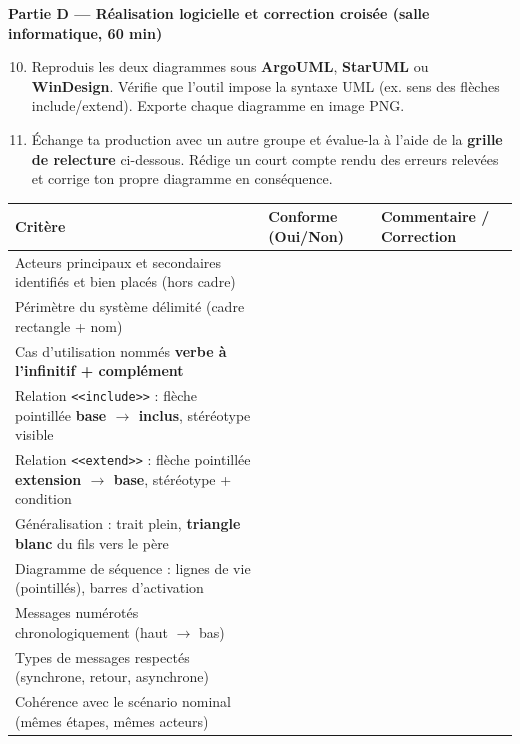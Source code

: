 \documentclass[11pt]{article}
\begin{document}
\textbf{Partie D — Réalisation logicielle et correction croisée (salle informatique, 60 min)}

\begin{enumerate}
  \setcounter{enumi}{9}
  \item Reproduis les deux diagrammes sous \textbf{ArgoUML}, \textbf{StarUML} ou \textbf{WinDesign}. Vérifie que l'outil impose la syntaxe UML (ex. sens des flèches include/extend). Exporte chaque diagramme en image PNG.
  \item Échange ta production avec un autre groupe et évalue-la à l'aide de la \textbf{grille de relecture} ci-dessous. Rédige un court compte rendu des erreurs relevées et corrige ton propre diagramme en conséquence.
\end{enumerate}

\begin{aretenir}
\begin{center}
\begin{tabularx}{\linewidth}{|l|X|X|}\hline
\textbf{Critère} & \textbf{Conforme (Oui/Non)} & \textbf{Commentaire / Correction} \\\hline
Acteurs principaux et secondaires identifiés et bien placés (hors cadre) & & \\\hline
Périmètre du système délimité (cadre rectangle + nom) & & \\\hline
Cas d'utilisation nommés \textbf{verbe à l'infinitif + complément} & & \\\hline
Relation \texttt{<<include>>} : flèche pointillée \textbf{base $\to$ inclus}, stéréotype visible & & \\\hline
Relation \texttt{<<extend>>} : flèche pointillée \textbf{extension $\to$ base}, stéréotype + condition & & \\\hline
Généralisation : trait plein, \textbf{triangle blanc} du fils vers le père & & \\\hline
Diagramme de séquence : lignes de vie (pointillés), barres d'activation & & \\\hline
Messages numérotés chronologiquement (haut $\to$ bas) & & \\\hline
Types de messages respectés (synchrone, retour, asynchrone) & & \\\hline
Cohérence avec le scénario nominal (mêmes étapes, mêmes acteurs) & & \\\hline
\end{tabularx}
\end{center}
\end{aretenir}
\end{document}
